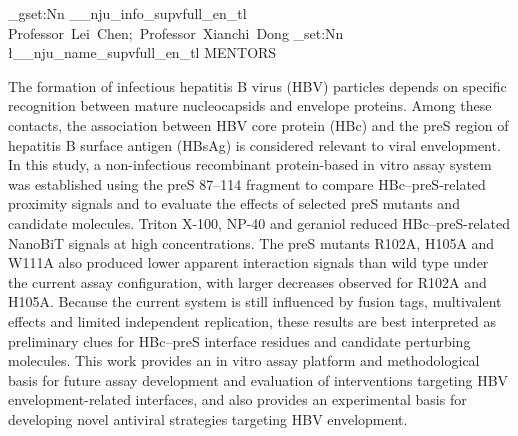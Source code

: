 \documentclass[
    fontset = fandol, %
  ]{njuthesis}
\begin{document}
\ExplSyntaxOn
\tl_gset:Nn \g__nju_info_supvfull_en_tl { Professor~Lei~Chen;~Professor~Xianchi~Dong }
\tl_set:Nn \l__nju_name_supvfull_en_tl { MENTORS }
\ExplSyntaxOff


\maketitle

\raggedbottom

\begin{abstract}
  乙型肝炎病毒（HBV）感染性颗粒的形成依赖成熟核衣壳与包膜蛋白之间的特异性识别，其中HBV核心蛋白HBc与表面蛋白HBsAg preS区的相互作用被认为与病毒包膜化有关。本研究围绕preS 87--114片段建立非感染性重组蛋白体外检测体系，用于比较HBc--preS相关空间接近信号，并评价关键突变体和候选分子的影响。结果显示，Triton X-100、NP-40和香叶醇在高浓度条件下可降低HBc--preS相关NanoBiT信号；preS R102A、H105A和W111A突变体的相关信号低于野生型，其中R102A和H105A的下降更明显。考虑到当前体系仍受标签、多价效应和重复数量限制，这些结果更适合作为HBc--preS界面残基和候选扰动分子的初步线索。本研究为后续评估HBc--preS界面在HBV包膜化干预研究中的作用提供了体外检测平台和方法学依据，并为开发靶向HBV包膜化的新型抗病毒策略提供了一定的实验基础。
\end{abstract}

\begin{abstract*}
  The formation of infectious hepatitis B virus (HBV) particles depends on specific recognition between mature nucleocapsids and envelope proteins. Among these contacts, the association between HBV core protein (HBc) and the preS region of hepatitis B surface antigen (HBsAg) is considered relevant to viral envelopment. In this study, a non-infectious recombinant protein-based in vitro assay system was established using the preS 87--114 fragment to compare HBc--preS-related proximity signals and to evaluate the effects of selected preS mutants and candidate molecules. Triton X-100, NP-40 and geraniol reduced HBc--preS-related NanoBiT signals at high concentrations. The preS mutants R102A, H105A and W111A also produced lower apparent interaction signals than wild type under the current assay configuration, with larger decreases observed for R102A and H105A. Because the current system is still influenced by fusion tags, multivalent effects and limited independent replication, these results are best interpreted as preliminary clues for HBc--preS interface residues and candidate perturbing molecules. This work provides an in vitro assay platform and methodological basis for future assay development and evaluation of interventions targeting HBV envelopment-related interfaces, and also provides an experimental basis for developing novel antiviral strategies targeting HBV envelopment.
\end{abstract*}
\end{document}
